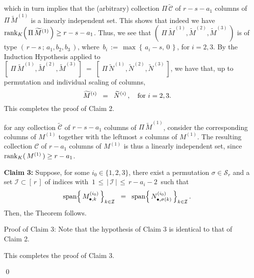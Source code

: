 which in turn implies that the (arbitrary) collection $\Pi\,\widetilde{\mathcal{C}}$ of $r - s - a_{1}$ columns of
$\Pi\,\widetilde{M}^{(1)}$ is a linearly independent set.
This shows that indeed we have $\textnormal{rank}_{K}\!\left(\,\Pi\,\widetilde{M}^{(1)}\,\right) \geq r - s - a_{1}$.
Thus, we see that $\left(\;\Pi\,\widetilde{M}^{(1)},\widetilde{M}^{(2)},\widetilde{M}^{(3)}\,\right)$
is of type $\left(\,r-s\,;\,a_{1},b_{2},b_{3}\,\right)$, where
\,$b_{i} \,:=\, \max\!\left\{\,a_{i}-s,\,0\,\right\}$, for $i = 2,3$.
By the Induction Hypothesis applied to
$\left[\;\Pi\,\widetilde{M}^{(1)},\widetilde{M}^{(2)},\widetilde{M}^{(3)}\,\right]
\; = \; \left[\;\Pi\,\widetilde{N}^{(1)},\widetilde{N}^{(2)},\widetilde{N}^{(3)}\,\right]$,
we have that, up to permutation and individual scaling of columns,
\begin{equation*}
\widetilde{M}^{(i)} \;\; = \;\; \widetilde{N}^{(i)}\,,
\quad\textnormal{for $i = 2,3$}.
\end{equation*}
This completes the proof of Claim 2.


for any collection $\widetilde{\mathcal{C}}$ of $r - s - a_{1}$ columns of $\Pi\,\widetilde{M}^{(1)}$,
consider the corresponding columns of $M^{(1)}$ together with the leftmost $s$ columns of $M^{(1)}$.
The resulting collection $\mathcal{C}$ of $r-a_{1}$ columns of $M^{(1)}$ is thus a linearly independent set, since
$\textnormal{rank}_{K}(\,M^{(1)}\,) \geq r - a_{1}$.

\vskip 0.5cm
\begin{center}
\begin{minipage}{6.0in}
\textbf{Claim 3:}
\vskip 0.025cm
\noindent
Suppose, for some $i_{0} \in \{1,2,3\}$, there exist a permutation $\sigma \in \mathcal{S}_{r}$
and a set $\mathcal{I} \subset \left[\,r\,\right]$ of indices with
\,$1 \,\leq\, \left\vert\,\mathcal{I}\,\right\vert \,\leq\, r - a_{i} - 2$\, such that
\begin{equation*}
\textnormal{span}\!\left\{\,M^{(i_{0})}_{\bullet,k}\,\right\}_{k\in\mathcal{I}}
\;\; = \;\;
\textnormal{span}\!\left\{\,N^{(i_{0})}_{\bullet,\sigma(k)}\,\right\}_{k\in\mathcal{I}}.
\end{equation*}
Then, the Theorem follows.
\end{minipage}
\end{center}
Proof of Claim 3:\; Note that the hypothesis of Claim 3 is identical to that of Claim 2.

This completes the proof of Claim 3.

\qed


